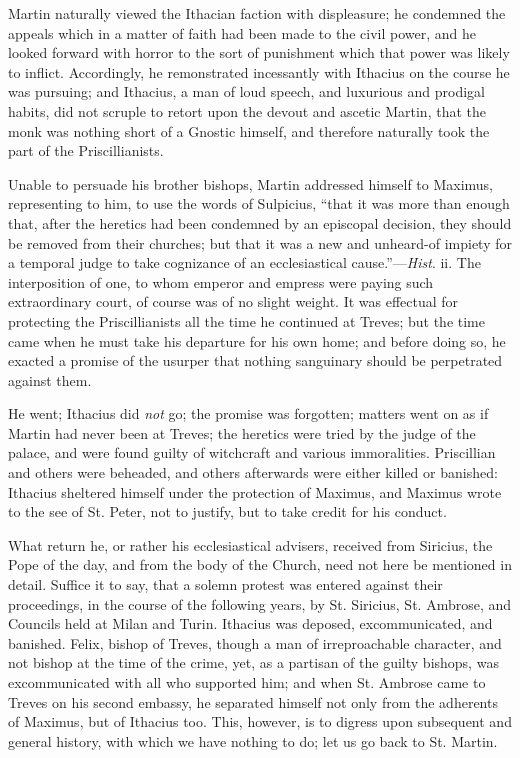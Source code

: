 Martin naturally viewed the Ithacian faction with displeasure; he
condemned the appeals which in a matter of faith had been made
to the civil power, and he looked forward with horror to the sort of
punishment which that power was likely to inflict. Accordingly, he
remonstrated incessantly with Ithacius on the course he was pursuing;
and Ithacius, a man of loud speech, and luxurious and prodigal habits,
did not scruple to retort upon the devout and ascetic Martin, that the
monk was nothing short of a Gnostic himself, and therefore naturally
took the part of the Priscillianists.

Unable to persuade his brother bishops, Martin addressed himself to
Maximus, representing to him, to use the words of Sulpicius,
``that it was more than enough that, after the heretics had been
condemned by an episcopal decision, they should be removed from their
churches; but that it was a new and unheard-of impiety for a temporal
judge to take cognizance of an ecclesiastical cause.''—\emph{Hist}.
ii. The interposition of one, to whom emperor and empress were paying
such extraordinary court, of course was of no slight weight. It was
effectual for protecting the Priscillianists all the time he continued
at Treves; but the time came when he must take his departure for his
own home; and before doing so, he exacted a promise of the usurper
that nothing sanguinary should be perpetrated against them.

He went; Ithacius did \emph{not} go; the promise was forgotten; matters
went on as if Martin had never been at Treves; the heretics were tried
by the judge of the palace, and were found guilty of witchcraft and
various immoralities. Priscillian and others were beheaded, and others
afterwards were either killed or banished: Ithacius sheltered himself
under the protection of Maximus, and Maximus wrote to the see of St.
Peter, not to justify, but to take credit for his conduct.

What return he, or rather his ecclesiastical advisers, received from Siricius, the Pope of the day, and from the body of the
Church, need not here be mentioned in detail. Suffice it to say, that
a solemn protest was entered against their proceedings, in the course
of the following years, by St. Siricius, St. Ambrose, and Councils
held at Milan and Turin. Ithacius was deposed, excommunicated, and
banished. Felix, bishop of Treves, though a man of irreproachable
character, and not bishop at the time of the crime, yet, as a partisan
of the guilty bishops, was excommunicated with all who supported him;
and when St. Ambrose came to Treves on his second embassy, he
separated himself not only from the adherents of Maximus, but of
Ithacius too. This, however, is to digress upon subsequent and general
history, with which we have nothing to do; let us go back to St.
Martin.

